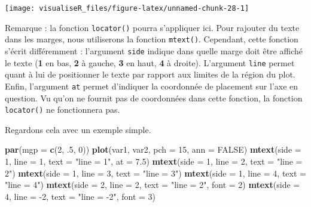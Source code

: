 \documentclass[]{article}
\newenvironment{Shaded}{\begin{snugshade}}{\end{snugshade}}
\newcommand{\DataTypeTok}[1]{\textcolor[rgb]{0.13,0.29,0.53}{#1}}
\newcommand{\DecValTok}[1]{\textcolor[rgb]{0.00,0.00,0.81}{#1}}
\newcommand{\FloatTok}[1]{\textcolor[rgb]{0.00,0.00,0.81}{#1}}
\newcommand{\KeywordTok}[1]{\textcolor[rgb]{0.13,0.29,0.53}{\textbf{#1}}}
\newcommand{\NormalTok}[1]{#1}
\newcommand{\OtherTok}[1]{\textcolor[rgb]{0.56,0.35,0.01}{#1}}
\newcommand{\StringTok}[1]{\textcolor[rgb]{0.31,0.60,0.02}{#1}}
\begin{document}
\begin{center}\texttt{[image: visualiseR\_files/figure-latex/unnamed-chunk-28-1]} \end{center}

Remarque : la fonction \texttt{locator()} pourra s'appliquer ici.
Pour rajouter du texte dans les marges, nous utiliserons la fonction \texttt{mtext()}. Cependant, cette fonction s'écrit différemment : l'argument \texttt{side} indique dans quelle marge doit être affiché le texte (\textbf{1} en bas, \textbf{2} à gauche, \textbf{3} en haut, \textbf{4} à droite). L'argument \texttt{line} permet quant à lui de positionner le texte par rapport aux limites de la région du plot. Enfin, l'argument \texttt{at} permet d'indiquer la coordonnée de placement sur l'axe en question.
Vu qu'on ne fournit pas de coordonnées dans cette fonction, la fonction \texttt{locator()} ne fonctionnera pas.

Regardons cela avec un exemple simple.

\begin{Shaded}
\begin{Highlighting}[]
\KeywordTok{par}\NormalTok{(}\DataTypeTok{mgp =} \KeywordTok{c}\NormalTok{(}\DecValTok{2}\NormalTok{, }\FloatTok{.5}\NormalTok{, }\DecValTok{0}\NormalTok{))}
\KeywordTok{plot}\NormalTok{(var1, var2, }\DataTypeTok{pch =} \DecValTok{15}\NormalTok{, }\DataTypeTok{ann =} \OtherTok{FALSE}\NormalTok{)}
\KeywordTok{mtext}\NormalTok{(}\DataTypeTok{side =} \DecValTok{1}\NormalTok{, }\DataTypeTok{line =} \DecValTok{1}\NormalTok{, }\DataTypeTok{text =} \StringTok{"line = 1"}\NormalTok{, }\DataTypeTok{at =} \FloatTok{7.5}\NormalTok{)}
\KeywordTok{mtext}\NormalTok{(}\DataTypeTok{side =} \DecValTok{1}\NormalTok{, }\DataTypeTok{line =} \DecValTok{2}\NormalTok{, }\DataTypeTok{text =} \StringTok{"line = 2"}\NormalTok{)}
\KeywordTok{mtext}\NormalTok{(}\DataTypeTok{side =} \DecValTok{1}\NormalTok{, }\DataTypeTok{line =} \DecValTok{3}\NormalTok{, }\DataTypeTok{text =} \StringTok{"line = 3"}\NormalTok{)}
\KeywordTok{mtext}\NormalTok{(}\DataTypeTok{side =} \DecValTok{1}\NormalTok{, }\DataTypeTok{line =} \DecValTok{4}\NormalTok{, }\DataTypeTok{text =} \StringTok{"line = 4"}\NormalTok{)}
\KeywordTok{mtext}\NormalTok{(}\DataTypeTok{side =} \DecValTok{2}\NormalTok{, }\DataTypeTok{line =} \DecValTok{2}\NormalTok{, }\DataTypeTok{text =} \StringTok{"line = 2"}\NormalTok{, }\DataTypeTok{font =} \DecValTok{2}\NormalTok{)}
\KeywordTok{mtext}\NormalTok{(}\DataTypeTok{side =} \DecValTok{4}\NormalTok{, }\DataTypeTok{line =} \DecValTok{-2}\NormalTok{, }\DataTypeTok{text =} \StringTok{"line = -2"}\NormalTok{, }\DataTypeTok{font =} \DecValTok{3}\NormalTok{)}
\end{Highlighting}
\end{Shaded}
\end{document}
